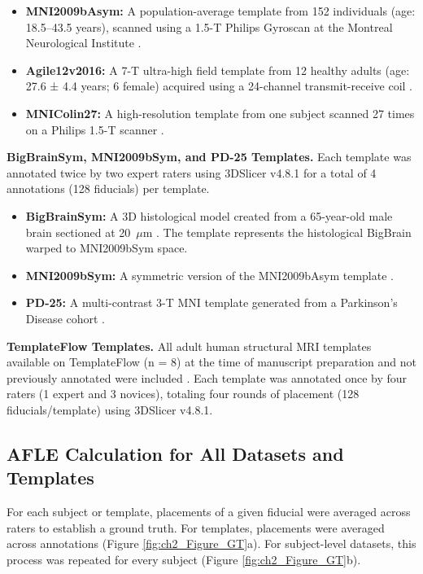 \begin{itemize}
    \item \textbf{MNI2009bAsym:} A population-average template from 152 individuals (age: 18.5–43.5 years), scanned using a 1.5-T Philips Gyroscan at the Montreal Neurological Institute \cite{Fonov2009-oi}.
    \item \textbf{Agile12v2016:} A 7-T ultra-high field template from 12 healthy adults (age: 27.6 ± 4.4 years; 6 female) acquired using a 24-channel transmit-receive coil \cite{Lau2017-ea}.
    \item \textbf{MNIColin27:} A high-resolution template from one subject scanned 27 times on a Philips 1.5-T scanner \cite{Collins1994-dx}.
\end{itemize}


\textbf{BigBrainSym, MNI2009bSym, and PD-25 Templates.} Each template was annotated twice by two expert raters using 3DSlicer v4.8.1 for a total of 4 annotations (128 fiducials) per template. 

\begin{itemize}
    \item \textbf{BigBrainSym:} A 3D histological model created from a 65-year-old male brain sectioned at 20~$\mu$m \cite{Amunts2013-vu}. The template represents the histological BigBrain warped to MNI2009bSym space.
    \item \textbf{MNI2009bSym:} A symmetric version of the MNI2009bAsym template \cite{Fonov2009-oi}.
    \item \textbf{PD-25:} A multi-contrast 3-T MNI template generated from a Parkinson's Disease cohort \cite{Xiao2017-zp}.
\end{itemize}


\textbf{TemplateFlow Templates.} All adult human structural MRI templates available on TemplateFlow (n = 8) at the time of manuscript preparation and not previously annotated were included \cite{Ciric2022-bo}. Each template was annotated once by four raters (1 expert and 3 novices), totaling four rounds of placement (128 fiducials/template) using 3DSlicer v4.8.1.

\subsection{AFLE Calculation for All Datasets and Templates}
For each subject or template, placements of a given fiducial were averaged across raters to establish a ground truth. For templates, placements were averaged across annotations (Figure \ref{fig:ch2_Figure_GT}a). For subject-level datasets, this process was repeated for every subject (Figure \ref{fig:ch2_Figure_GT}b).

